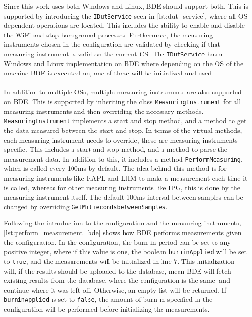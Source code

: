 

Since this work uses both Windows and Linux, BDE should support both. This is supported by introducing the \texttt{IDutService} seen in \cref{lst:dut_service}, where all OS dependent operations are located. This includes the ability to enable and disable the WiFi and stop background processes. Furthermore, the measuring instruments chosen in the configuration are validated by checking if that measuring instrument is valid on the current OS. The \texttt{IDutService} has a Windows and Linux implementation on BDE where depending on the OS of the machine BDE is executed on, one of these will be initialized and used.



\paragraph*{}
In addition to multiple OSs, multiple measuring instruments are also supported on BDE. This is supported by inheriting the class \texttt{MeasuringInstrument} for all measuring instruments and then overriding the necessary methods. \texttt{MeasuringInstrument} implements a start and stop method, and a method to get the data measured between the start and stop. In terms of the virtual methods, each measuring instrument needs to override, these are measuring instruments specific. This includes a start and stop method, and a method to parse the measurement data. In addition to this, it includes a method \texttt{PerformMeasuring}, which is called every 100ms by default. The idea behind this method is for measuring instruments like RAPL and LHM to make a measurement each time it is called, whereas for other measuring instruments like IPG, this is done by the measuring instrument itself. The default 100ms interval between samples can be changed by overriding \texttt{GetMiliecondsbetweenSamples}.



Following the introduction to the configuration and the measuring instruments, \cref{lst:perform_measurement_bde} shows how BDE performs measurements given the configuration. In the configuration, the burn-in period can be set to any positive integer, where if this value is one, the boolean \texttt{burninApplied} will be set to \texttt{true}, and the measurements will be initialized in line $7$. This initialization will, if the results should be uploaded to the database, mean BDE will fetch existing results from the database, where the configuration is the same, and continue where it was left off. Otherwise, an empty list will be returned. If \texttt{burninApplied} is set to \texttt{false}, the amount of burn-in specified in the configuration will be performed before initializing the measurements.


